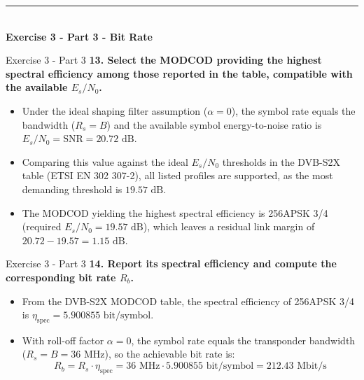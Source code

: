 \documentclass[10pt, aspectratio=169]{beamer}
\newcommand{\question}[1]{{\color{QuestionRed}\textbf{#1}}}
\begin{document}
	\begin{frame}[plain]
		\vfill
		\centering
		{\color{TealAccent}\rule{2cm}{2pt}}\\[0.4cm]
		{\LARGE\bfseries\color{NavyPrimary} Exercise 3 - Part 3 - Bit Rate}\\[0.2cm]
		\vfill
	\end{frame}
	
	
	\begin{frame}{Exercise 3 - Part 3}
		\question{13. Select the MODCOD providing the highest spectral efficiency among those reported in the table, compatible with the available $E_s/N_0$.}
		
		\vspace{0.1cm}
		\begin{itemize}
			\item Under the ideal shaping filter assumption ($\alpha = 0$), the symbol rate equals the bandwidth ($R_s = B$) and the available symbol energy-to-noise ratio is $E_s/N_0 = \text{SNR} = 20.72\text{ dB}$.
			\item Comparing this value against the ideal $E_s/N_0$ thresholds in the DVB-S2X table (ETSI EN 302 307-2), all listed profiles are supported, as the most demanding threshold is $19.57\text{ dB}$.
			\item The MODCOD yielding the highest spectral efficiency is 256APSK 3/4 (required $E_s/N_0 = 19.57\text{ dB}$), which leaves a residual link margin of $20.72 - 19.57 = 1.15\text{ dB}$.
		\end{itemize}
		
	\end{frame}
	
	\begin{frame}{Exercise 3 - Part 3}
		\question{14. Report its spectral efficiency and compute the corresponding bit rate $R_b$.}
		
		\vspace{0.1cm}
		\begin{itemize}
			\item From the DVB-S2X MODCOD table, the spectral efficiency of 256APSK 3/4 is $\eta_{\text{spec}} = 5.900855\text{ bit/symbol}$.
			\item With roll-off factor $\alpha = 0$, the symbol rate equals the transponder bandwidth ($R_s = B = 36\text{ MHz}$), so the achievable bit rate is:
			\[
			R_b = R_s \cdot \eta_{\text{spec}} = 36\text{ MHz} \cdot 5.900855\text{ bit/symbol} = 212.43\text{ Mbit/s}
			\]
		\end{itemize}
		
	\end{frame}
	
\end{document}
